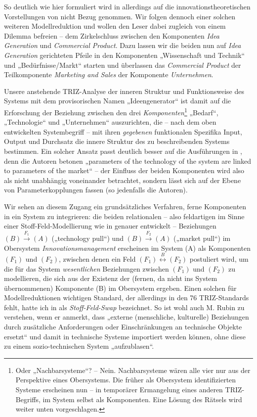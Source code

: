 \documentclass[12pt,a4paper]{article}
\begin{document}
So deutlich wie hier formuliert wird in \cite{TESE2018} allerdings auf die
innovationstheoretischen Vorstellungen von \cite{Preez2006} nicht Bezug
genommen.  Wir folgen dennoch einer solchen weiteren Modellreduktion und
wollen den Leser dabei zugleich von einem Dilemma befreien -- dem
Zirkelschluss zwischen den Komponenten \emph{Idea Generation} und
\emph{Commercial Product}.  Dazu lassen wir die beiden nun auf \emph{Idea
  Generation} gerichteten Pfeile in den Komponenten „Wissenschaft und Technik“
und „Bedürfnisse/Markt“ starten und überlassen das \emph{Commercial Product}
der Teilkomponente \emph{Marketing and Sales} der Komponente
\emph{Unternehmen}.

Unsere anstehende TRIZ-Analyse der inneren Struktur und Funktionsweise des
Systems mit dem provisorischen Namen „Ideengenerator“ ist damit auf die
Erforschung der Beziehung zwischen den drei \emph{Komponenten}\footnote{Oder
  „Nachbarsysteme“?  -- Nein. Nachbarsysteme wären alle vier nur aus der
  Perspektive eines Obersystems.  Die früher als Obersystem identifizierten
  Systeme erscheinen nun -- in temporärer Ermangelung eines anderen
  TRIZ-Begriffs, im System selbst als Komponenten. Eine Lösung des Rätsels
  wird weiter unten vorgeschlagen. } „Bedarf“, „Technologie“ und „Unternehmen“
auszurichten, die -- nach dem oben entwickelten Systembegriff -- mit ihren
\emph{gegebenen} funktionalen Spezifika Input, Output und Durchsatz die innere
Struktur des zu beschreibenden Systems bestimmen.  Ein solcher Ansatz passt
deutlich besser auf die Ausführungen in \cite[Kap. 1]{TESE2018}, denn die
Autoren betonen „parameters of the technology of the system are linked to
parameters of the market“ -- der Einfluss der beiden Komponenten wird also als
nicht unabhängig voneinander betrachtet, sondern lässt sich auf der Ebene von
Parameterkopplungen fassen (so jedenfalls die Autoren).

Wir sehen an diesem Zugang ein grundsätzliches Verfahren, ferne Komponenten in
ein System zu integrieren: die beiden relationalen -- also feldartigen im
Sinne einer Stoff-Feld-Modellierung wie in \cite[Kap. 4.9]{KS2017} genauer
entwickelt -- Beziehungen $(B)\stackrel{F_1}{\longrightarrow} (A)$
(„technology pull“) und $(B) \stackrel{F_2}{\longrightarrow} (A)$ („market
pull“) im Obersystem \emph{Innovationsmanagement} erscheinen im System (A) als
Komponenten $(F_1)$ und $(F_2)$, zwischen denen ein Feld
$(F_1)\stackrel{B}{\longleftrightarrow}(F_2)$ postuliert wird, um die für das
System \emph{wesentlichen} Beziehungen zwischen $(F_1)$ und $(F_2)$ zu
modellieren, die sich aus der Existenz der (fernen, da nicht ins System
übernommenen) Komponente (B) im Obersystem ergeben.  Einen solchen für
Modellreduktionen wichtigen Standard, der allerdings in den 76 TRIZ-Standards
fehlt, hatte ich in \cite{Graebe2019a} als \emph{Stoff-Feld-Swap} bezeichnet.
So ist wohl auch M. Rubin zu verstehen, wenn er anmerkt, dass „externe
(menschliche, kulturelle) Beziehungen durch zusätzliche Anforderungen oder
Einschränkungen an technische Objekte ersetzt“ und damit in technische Systeme
importiert werden können, ohne diese zu einem sozio-technischen System
„aufzublasen“.
\end{document}
